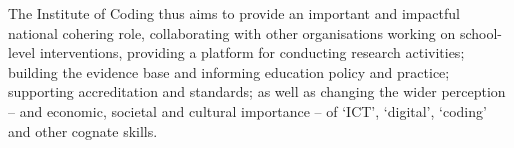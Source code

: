 \documentclass[conference]{IEEEtran}
\begin{document}
The Institute of Coding thus aims to provide an important and
impactful national cohering role, collaborating with other
organisations working on school-level interventions, providing a
platform for conducting research activities; building the evidence
base and informing education policy and practice; supporting
accreditation and standards; as well as changing the wider perception
-- and economic, societal and cultural importance -- of `ICT',
`digital', `coding' and other cognate skills.





 
\end{document}
